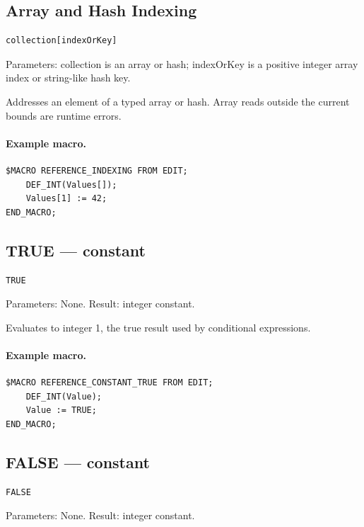 \documentclass[a4paper,10pt,twoside,openany]{book}
\newenvironment{mrmacextension}{\begin{changebar}}{\end{changebar}}
\begin{document}
\begin{mrmacextension}
\label{prim:form-indexing}
\subsection*{Array and Hash Indexing}
\begin{verbatim}
collection[indexOrKey]
\end{verbatim}
Parameters: collection is an array or hash; indexOrKey is a positive integer array index or string-like hash key.

Addresses an element of a typed array or hash. Array reads outside the current bounds are runtime errors.

\paragraph{Example macro.}
\begin{verbatim}
$MACRO REFERENCE_INDEXING FROM EDIT;
    DEF_INT(Values[]);
    Values[1] := 42;
END_MACRO;
\end{verbatim}
\end{mrmacextension}

\label{prim:constant-true}
\subsection*{TRUE --- constant}
\begin{verbatim}
TRUE
\end{verbatim}
Parameters: None. Result: integer constant.

Evaluates to integer 1, the true result used by conditional expressions.

\paragraph{Example macro.}
\begin{verbatim}
$MACRO REFERENCE_CONSTANT_TRUE FROM EDIT;
    DEF_INT(Value);
    Value := TRUE;
END_MACRO;
\end{verbatim}

\label{prim:constant-false}
\subsection*{FALSE --- constant}
\begin{verbatim}
FALSE
\end{verbatim}
Parameters: None. Result: integer constant.
\end{document}
